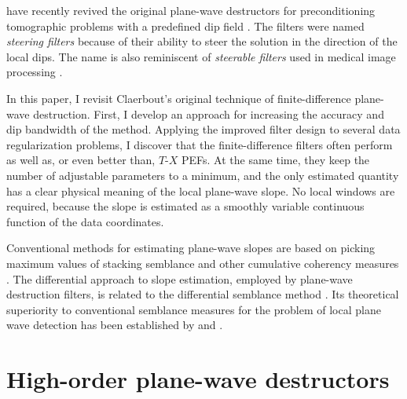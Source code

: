 \par
\cite{SEG-1998-1851} have recently revived the original
plane-wave destructors for preconditioning tomographic problems with a
predefined dip field \cite[]{Clapp.sepphd.106}. The filters were named
\emph{steering filters} because of their ability to steer the solution
in the direction of the local dips. The name is also reminiscent of
\emph{steerable filters} used in medical image processing \cite[]{steer0,steer}.
\par
In this paper, I revisit Claerbout's original technique of
finite-difference plane-wave destruction. First, I develop an approach
for increasing the accuracy and dip bandwidth of the method.  Applying
the improved filter design to several data regularization problems, I
discover that the finite-difference filters often perform as well as,
or even better than, $T$-$X$ PEFs.  At the same time, they keep the
number of adjustable parameters to a minimum, and the only estimated quantity 
has a clear physical meaning of the local plane-wave slope. 
No local windows are required, because the slope is estimated as a 
smoothly variable continuous function of the data coordinates.
\par
Conventional methods for estimating plane-wave slopes are based on
picking maximum values of stacking semblance and other cumulative
coherency measures \cite[]{GEO36-03-04820497}. The differential approach
to slope estimation, employed by plane-wave destruction filters, is
related to the differential semblance method \cite[]{GEO56-05-06540663}.
Its theoretical superiority to conventional semblance measures for the
problem of local plane wave detection has been established by
\cite{symes} and \cite{kim}.

\section{High-order plane-wave destructors}

